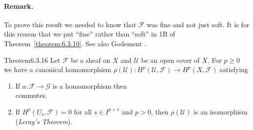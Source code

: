 \paragraph{Remark.} To prove this result we needed to know that $\mathcal F$ was fine and not just soft. It is for this reason that we put ``fine'' rather than ``soft'' in 1B of Theorem~\ref{theorem:6.3.10}. See also Godement \cite[Theorem 5.2.3, Chapter 2]{bib:II:godement-r:1}.
\begin{originaltheorem}{Theorem}{6.3.16}
Let $\mathcal F$ be a sheaf on $X$ and $\mathcal U$ be an open cover of $X$. For $p\geq0$ we have a canonical homomorphism $\rho(\mathcal U):H^p(\mathcal U,\mathcal F)\to H^p(X,\mathcal F)$ satisfying
\begin{enumerate}[label=\Alph*.]
\item If $a:\mathcal F\to\mathcal G$ is a homomorphism then
\[

\]
commutes.
\item If $H^p(U_s,\mathcal F)=0$ for all $s\in I^{p+1}$ and $p>0$, then $\rho(\mathcal U)$ is an isomorphism (\emph{Leray's Theorem}).
\end{enumerate}
\end{originaltheorem}
